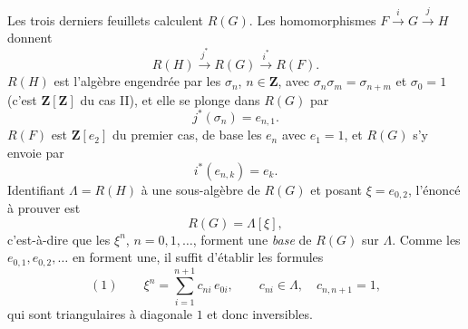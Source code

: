 \documentclass[11pt,a4paper]{article}
\begin{document}
Les trois derniers feuillets calculent $R(G)$. Les homomorphismes
$F \xrightarrow{i} G \xrightarrow{j} H$ donnent
\[
R(H) \xrightarrow{\ j^{*}\ } R(G) \xrightarrow{\ i^{*}\ } R(F) .
\]
$R(H)$ est l'algèbre engendrée par les $\sigma_{n}$, $n \in \mathbf{Z}$, avec
$\sigma_{n}\sigma_{m} = \sigma_{n+m}$ et $\sigma_{0} = 1$ (c'est
$\mathbf{Z}[\mathbf{Z}]$ du cas II), et elle se plonge dans $R(G)$ par
\[
j^{*}(\sigma_{n}) = e_{n,1} .
\]
$R(F)$ est $\mathbf{Z}[e_{2}]$ du premier cas, de base les $e_{n}$ avec
$e_{1} = 1$, et $R(G)$ s'y envoie par
\[
i^{*}(e_{n,k}) = e_{k} .
\]
Identifiant $\Lambda = R(H)$ à une sous-algèbre de $R(G)$ et posant
$\xi = e_{0,2}$, l'énoncé à prouver est
\[
R(G) = \Lambda[\xi] ,
\]
c'est-à-dire que les $\xi^{n}$, $n = 0, 1, \ldots$, forment une \emph{base} de
$R(G)$ sur $\Lambda$. Comme les $e_{0,1}, e_{0,2}, \ldots$ en forment une, il
suffit d'établir les formules
\[
(1)\qquad \xi^{n} = \sum_{i=1}^{n+1} c_{ni}\,e_{0i} ,
\qquad c_{ni} \in \Lambda , \quad c_{n,n+1} = 1 ,
\]
qui sont triangulaires à diagonale $1$ et donc inversibles.
\end{document}
